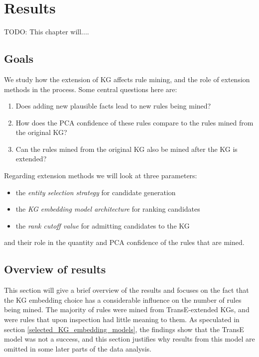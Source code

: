 \chapter{Results}
TODO: This chapter will....
\section{Goals}
We study how the extension of KG affects rule mining, and the role of extension methods in the process. Some central questions here are:
\begin{enumerate}
    \item Does adding new plausible facts lead to new rules being mined? 
    \item How does the PCA confidence of these rules compare to the rules mined from the original KG?
    \item Can the rules mined from the original KG also be mined after the KG is extended?
\end{enumerate}
Regarding extension methods we will look at three parameters:
\begin{itemize}
    \item the \textit{entity selection strategy} for candidate generation
    \item the \textit{KG embedding model architecture} for ranking candidates
    \item the \textit{rank cutoff value} for admitting candidates to the KG
\end{itemize}
and their role in the quantity and PCA confidence of the rules that are mined.

\section{Overview of results}
This section will give a brief overview of the results and focuses on the fact that the KG embedding choice has a considerable influence on the number of rules being mined. The majority of rules were mined from TransE-extended KGs, and were rules that upon inspection had little meaning to them. As speculated in section \ref{selected_KG_embedding_models}, the findings show that the TransE model was not a success, and this section justifies why results from this model are omitted in some later parts of the data analysis.

